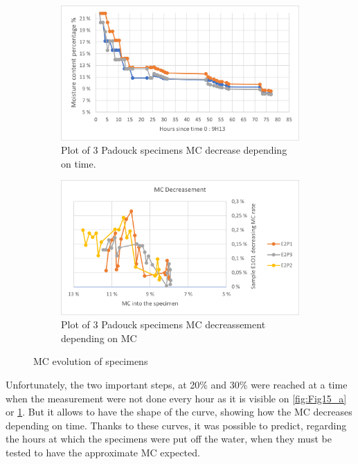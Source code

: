 \begin{figure}[th]
		\hfill
	\begin{subfigure}{0.48\linewidth}
		\includegraphics[width=\textwidth]{Figures/Padouck_MCdecreas}
		\caption[Padouck MC decrease depending on time.]{Plot of 3 Padouck specimens MC decrease depending on time.}
		\label{fig:Fig15_c}
	\end{subfigure}
		\hfill
	\begin{subfigure}{0.48\linewidth}
		\includegraphics[width=\textwidth]{Figures/Padouck_MCevol}
		\caption[MC decreassement depending on MC for 3 Padouck samples]{Plot of 3 Padouck specimens MC decreassement depending on MC}
		\label{fig:Fig15_d}
	\end{subfigure}
	\caption{MC evolution of specimens}
	\label{fig:Fig15}
	
\end{figure}

Unfortunately, the two important steps, at 20\% and 30\% were reached at a time when the measurement were not done every hour as it is visible on \ref{fig:Fig15_a} or \ref{fig:Fig15_c}. But it allows to have the shape of the curve, showing how the MC decreases depending on time. Thanks to these curves, it was possible to predict, regarding the hours at which the specimens were put off the water, when they must be tested to have the approximate MC expected.

